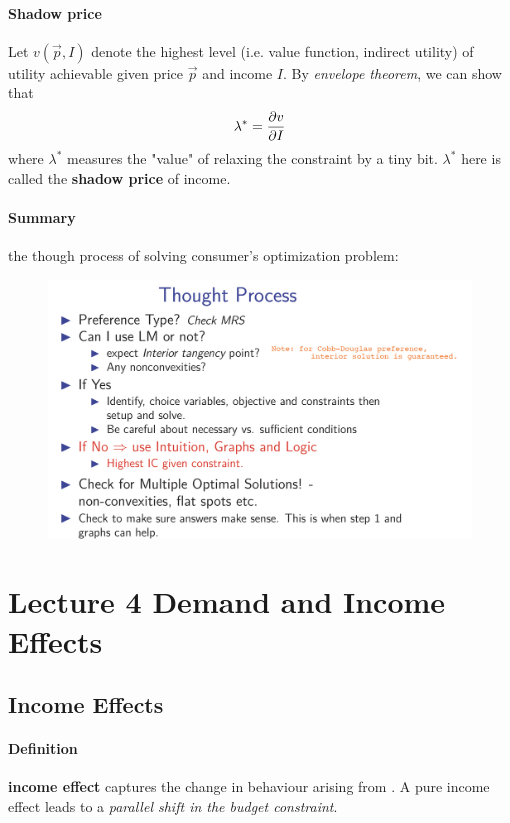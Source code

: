 \documentclass{article}
\begin{document}
				\paragraph{Shadow price} Let $v(\vec{p},I)$ denote the highest level (i.e. value function, indirect utility) of utility achievable given price $\vec{p}$ and income $I$. By \emph{envelope theorem}, we can show that
					\[
						\lambda^* = \frac{\partial{v}}{\partial{I}}
					\]
					where $\lambda^*$ measures the "value" of relaxing the constraint by a tiny bit. $\lambda^*$ here is called the \textbf{shadow price} of income.
				\paragraph{Summary} the though process of solving consumer's optimization problem:
					\begin{figure}[h]
						\centering
						\includegraphics[width=\linewidth]{figure/lec3_4}
					\end{figure}
					
	\section{Lecture 4 Demand and Income Effects}
		\subsection{Income Effects}
			\paragraph{Definition} \textbf{income effect} captures the change in behaviour arising from . A pure income effect leads to a \emph{parallel shift in the budget constraint}.
\end{document}
